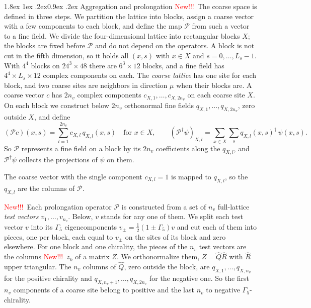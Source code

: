 \documentclass[11pt,a4paper]{article}
\makeatletter
\newif\ifshownew \shownewtrue
\DeclareRobustCommand\New{\ifshownew\textcolor{red}{New!!!}\ \else\ignorespaces\fi}
\renewcommand\subsubsection{\@startsection{subsubsection}{3}{\z@}%
  {1.8ex \@plus 1ex \@minus .2ex}{0.9ex \@plus .2ex}%
  {\centering\normalfont\small\bfseries\itshape}}
\numberwithin{equation}{section}
\newcommand{\dg}{^{\dagger}}
\newcommand{\Gfive}{\Gamma_5}
\newcommand{\Pro}{\mathcal P}
\makeatother
\begin{document}
\subsubsection{Aggregation and prolongation}
\label{sec:agg}
\New The coarse space is defined in three steps. We partition the lattice into blocks, assign a
coarse vector with a few components to each block, and define the map $\Pro$ from such a vector to
a fine field.
We divide the four-dimensional lattice into rectangular blocks $X$; the blocks are fixed before
$\Pro$ and do not depend on the operators. A block is not cut in the fifth dimension, so it
holds all $(x,s)$ with $x\in X$ and $s=0,\dots,L_s-1$. With $4^4$ blocks on $24^3\times48$ there
are $6^3\times12$ blocks, and a fine field has $4^4\times L_s\times12$ complex components on each.
The \emph{coarse lattice} has one site for each block, and two coarse sites are neighbors in
direction $\mu$ when their blocks are. A coarse vector $c$ has $2n_v$ complex components
$c_{X,1},\dots,c_{X,2n_v}$ on each coarse site $X$. On each block we construct below $2n_v$
orthonormal fine fields $q_{X,1},\dots,q_{X,2n_v}$, zero outside $X$, and define
\begin{equation}
(\Pro c)(x,s)=\sum_{l=1}^{2n_v}c_{X,l}\,q_{X,l}(x,s)\quad\text{for }x\in X,\qquad
(\Pro\dg\psi)_{X,l}=\sum_{x\in X}\sum_{s}q_{X,l}(x,s)\dg\,\psi(x,s).
\label{eq:Pdef}
\end{equation}
So $\Pro$ represents a fine field on a block by its $2n_v$ coefficients along the $q_{X,l}$, and
$\Pro\dg\psi$ collects the projections of $\psi$ on them.

The coarse vector with the single component $c_{X,l}=1$ is mapped to $q_{X,l}$, so the
$q_{X,l}$ are the columns of $\Pro$.

\New Each prolongation operator $\Pro$ is constructed from a set of $n_v$ full-lattice \emph{test
vectors} $v_1,\dots,v_{n_v}$. Below, $v$ stands for any one of them. We split each test vector $v$ into its $\Gfive$ eigencomponents
$v_\pm=\frac12(1\pm\Gfive)v$ and cut each of them into pieces, one per block, each equal to $v_\pm$
on the sites of its block and zero elsewhere. For one block and one chirality, the pieces of the
$n_v$ test vectors are the columns \New $z_k$ of a matrix $Z$. We orthonormalize them, $Z=\hat Q\hat R$ with $\hat R$
upper triangular. The $n_v$ columns of $\hat Q$, zero outside the block, are
$q_{X,1},\dots,q_{X,n_v}$ for the positive chirality and $q_{X,n_v+1},\dots,q_{X,2n_v}$ for the
negative one. So the first $n_v$ components of a coarse site belong to positive and the last
$n_v$ to negative $\Gfive$-chirality.
\end{document}
